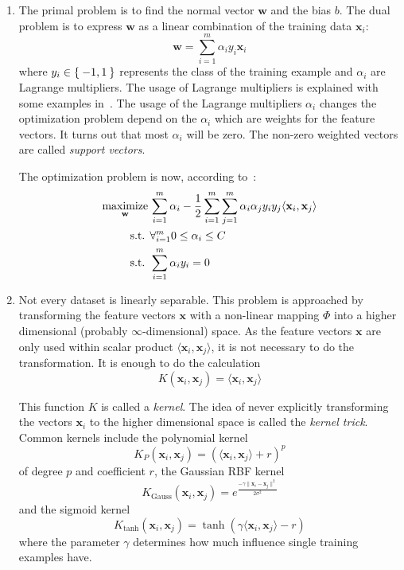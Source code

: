 \begin{enumerate}
    \item The primal problem is to find the normal vector $\mathbf{w}$ and the
          bias $b$. The dual problem is to express $\mathbf{w}$ as a linear
          combination of the training data $\mathbf{x}_i$:
          \[\mathbf{w} = \sum_{i=1}^m \alpha_i y_i \mathbf{x}_i\]
          where $y_i \in \Set{-1, 1}$ represents the class of the training
          example and $\alpha_i$ are Lagrange multipliers. The usage of
          Lagrange multipliers is explained with some examples
          in~\cite{smithlagrange}. The usage of the Lagrange multipliers
          $\alpha_i$ changes the optimization problem depend on the
          $\alpha_i$ which are weights for the feature vectors. It turns
          out that most $\alpha_i$ will be zero. The non-zero weighted vectors
          are called \textit{support vectors}.

          The optimization problem is now, according to~\cite{burges1998tutorial}:
          \begin{equation*}
          \begin{aligned}
              \operatorname*{maximize}_{\mathbf{w}}\,& \sum_{i=1}^m \alpha_i - \frac{1}{2} \sum_{i=1}^m \sum_{j=1}^m \alpha_i \alpha_j y_i y_j \langle \mathbf{x}_i, \mathbf{x}_j \rangle\\
              \text{s.t. } & \forall_{i=1}^m 0 \leq \alpha_i \leq C\\
              \text{s.t. } & \sum_{i=1}^m \alpha_i y_i = 0
          \end{aligned}
          \end{equation*}
    \item Not every dataset is linearly separable. This problem is approached
          by transforming the feature vectors $\mathbf{x}$ with a non-linear
          mapping $\Phi$ into a higher dimensional (probably
          $\infty$-dimensional) space. As the feature vectors $\mathbf{x}$
          are only used within scalar product
          $\langle \mathbf{x}_i, \mathbf{x}_j \rangle$, it is not necessary to
          do the transformation. It is enough to do the calculation
          \[K(\mathbf{x}_i, \mathbf{x}_j) = \langle \mathbf{x}_i, \mathbf{x}_j \rangle\]

          This function $K$ is called a \textit{kernel}. The idea of never
          explicitly transforming the vectors $\mathbf{x}_i$ to the higher
          dimensional space is called the \textit{kernel trick}. Common kernels
          include the polynomial kernel
          \[K_P(\mathbf{x}_i, \mathbf{x}_j) = (\langle \mathbf{x}_i, \mathbf{x}_j \rangle + r)^p\]
          of degree $p$ and coefficient $r$, the Gaussian \gls{RBF} kernel
          \[K_{\text{Gauss}}(\mathbf{x}_i, \mathbf{x}_j) = e^{\frac{-\gamma\|\mathbf{x}_i - \mathbf{x}_j\|^2}{2 \sigma^2}}\]
          and the sigmoid kernel
          \[K_{\text{tanh}}(\mathbf{x}_i, \mathbf{x}_j) = \tanh(\gamma \langle \mathbf{x}_i, \mathbf{x}_j \rangle - r)\]
          where the parameter $\gamma$ determines how much influence single
          training examples have.
\end{enumerate}

